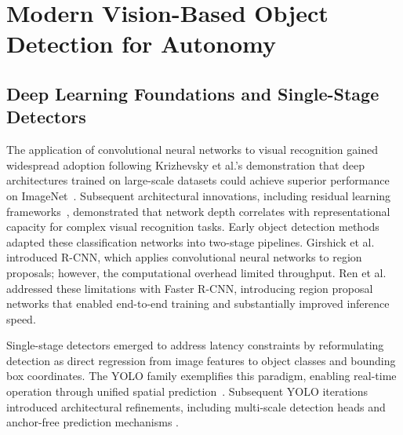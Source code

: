 \documentclass{erauthesis}
\begin{document}
\section{Modern Vision-Based Object Detection for Autonomy}

\subsection{Deep Learning Foundations and Single-Stage Detectors}

The application of convolutional neural networks to visual recognition gained widespread adoption following Krizhevsky et al.'s demonstration that deep architectures trained on large-scale datasets could achieve superior performance on ImageNet~\cite{krizhevsky2017}.
Subsequent architectural innovations, including residual learning frameworks~\cite{he2016}, demonstrated that network depth correlates with representational capacity for complex visual recognition tasks.
Early object detection methods adapted these classification networks into two-stage pipelines.
Girshick et al.~\cite{girshick2014} introduced R-CNN, which applies convolutional neural networks to region proposals; however, the computational overhead limited throughput.
Ren et al.~\cite{ren2016} addressed these limitations with Faster R-CNN, introducing region proposal networks that enabled end-to-end training and substantially improved inference speed.

Single-stage detectors emerged to address latency constraints by reformulating detection as direct regression from image features to object classes and bounding box coordinates.
The YOLO family exemplifies this paradigm, enabling real-time operation through unified spatial prediction~\cite{redmon2016}.
Subsequent YOLO iterations introduced architectural refinements, including multi-scale detection heads and anchor-free prediction mechanisms \cite{terven2023}.
\end{document}
